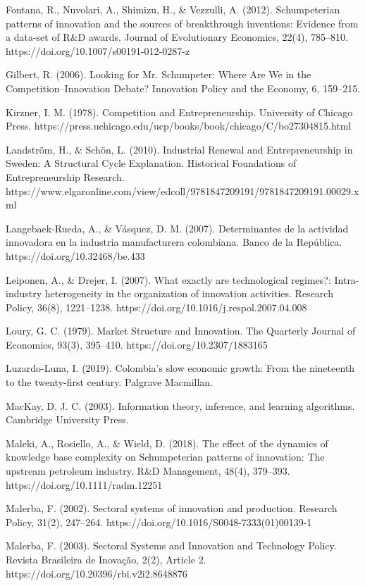 \documentclass[12pt,a4paper]{article}
\begin{document}
{Fontana, R., Nuvolari, A., Shimizu, H., \& Vezzulli, A. (2012). Schumpeterian patterns of innovation and the sources of breakthrough inventions: Evidence from a data-set of R\&D awards. Journal of Evolutionary Economics, 22(4), 785–810. https://doi.org/10.1007/s00191-012-0287-z

Gilbert, R. (2006). Looking for Mr. Schumpeter: Where Are We in the Competition--Innovation Debate? Innovation Policy and the Economy, 6, 159–215.

Kirzner, I. M. (1978). Competition and Entrepreneurship. University of Chicago Press. https://press.uchicago.edu/ucp/books/book/chicago/C/bo27304815.html

Landström, H., \& Schön, L. (2010). Industrial Renewal and Entrepreneurship in Sweden: A Structural Cycle Explanation. Historical Foundations of Entrepreneurship Research. https://www.elgaronline.com/view/edcoll/9781847209191/9781847209191.00029.xml

Langebaek-Rueda, A., \& Vásquez, D. M. (2007). Determinantes de la actividad innovadora en la industria manufacturera colombiana. Banco de la República. https://doi.org/10.32468/be.433

Leiponen, A., \& Drejer, I. (2007). What exactly are technological regimes?: Intra-industry heterogeneity in the organization of innovation activities. Research Policy, 36(8), 1221–1238. https://doi.org/10.1016/j.respol.2007.04.008

Loury, G. C. (1979). Market Structure and Innovation. The Quarterly Journal of Economics, 93(3), 395–410. https://doi.org/10.2307/1883165

Luzardo-Luna, I. (2019). Colombia’s slow economic growth: From the nineteenth to the twenty-first century. Palgrave Macmillan.

MacKay, D. J. C. (2003). Information theory, inference, and learning algorithms. Cambridge University Press.

Maleki, A., Rosiello, A., \& Wield, D. (2018). The effect of the dynamics of knowledge base complexity on Schumpeterian patterns of innovation: The upstream petroleum industry. R\&D Management, 48(4), 379–393. https://doi.org/10.1111/radm.12251

Malerba, F. (2002). Sectoral systems of innovation and production. Research Policy, 31(2), 247–264. https://doi.org/10.1016/S0048-7333(01)00139-1

Malerba, F. (2003). Sectoral Systems and Innovation and Technology Policy. Revista Brasileira de Inovação, 2(2), Article 2. https://doi.org/10.20396/rbi.v2i2.8648876

}
\end{document}
